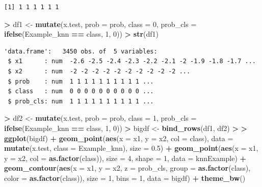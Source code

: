 \documentclass[]{krantz}
\makeatletter
\newenvironment{Shaded}{\begin{snugshade}}{\end{snugshade}}
\newcommand{\KeywordTok}[1]{\textcolor[rgb]{0.27,0.27,0.27}{\textbf{#1}}}
\newcommand{\DataTypeTok}[1]{\textcolor[rgb]{0.27,0.27,0.27}{#1}}
\newcommand{\DecValTok}[1]{\textcolor[rgb]{0.06,0.06,0.06}{#1}}
\newcommand{\FloatTok}[1]{\textcolor[rgb]{0.06,0.06,0.06}{#1}}
\newcommand{\StringTok}[1]{\textcolor[rgb]{0.5,0.5,0.5}{#1}}
\newcommand{\OperatorTok}[1]{\textcolor[rgb]{0.43,0.43,0.43}{\textbf{#1}}}
\newcommand{\ErrorTok}[1]{\textcolor[rgb]{0.14,0.14,0.14}{\textbf{#1}}}
\newcommand{\NormalTok}[1]{#1}
\newenvironment{kframe}{%
\medskip{}
\setlength{\fboxsep}{.8em}
 \def\at@end@of@kframe{}%
 \ifinner\ifhmode%
  \def\at@end@of@kframe{\end{minipage}}%
  \begin{minipage}{\columnwidth}%
 \fi\fi%
 \def\FrameCommand##1{\hskip\@totalleftmargin \hskip-\fboxsep
 \colorbox{shadecolor}{##1}\hskip-\fboxsep
     \hskip-\linewidth \hskip-\@totalleftmargin \hskip\columnwidth}%
 \MakeFramed {\advance\hsize-\width
   \@totalleftmargin\z@ \linewidth\hsize
   \@setminipage}}%
 {\par\unskip\endMakeFramed%
 \at@end@of@kframe}
\renewenvironment{Shaded}{\begin{kframe}}{\end{kframe}}
\makeatother
\begin{document}
\begin{verbatim}
[1] 1 1 1 1 1 1
\end{verbatim}

\begin{Shaded}
\begin{Highlighting}[]
\OperatorTok{>}\StringTok{ }\NormalTok{df1 <-}\StringTok{ }\KeywordTok{mutate}\NormalTok{(x.test, }\DataTypeTok{prob =}\NormalTok{ prob, }\DataTypeTok{class =} \DecValTok{0}\NormalTok{,  }\DataTypeTok{prob_cls =} \KeywordTok{ifelse}\NormalTok{(Example_knn }\OperatorTok{==}\StringTok{ }\NormalTok{class, }\DecValTok{1}\NormalTok{, }\DecValTok{0}\NormalTok{))}
\OperatorTok{>}\StringTok{ }\KeywordTok{str}\NormalTok{(df1)}
\end{Highlighting}
\end{Shaded}

\begin{verbatim}
'data.frame':   3450 obs. of  5 variables:
 $ x1      : num  -2.6 -2.5 -2.4 -2.3 -2.2 -2.1 -2 -1.9 -1.8 -1.7 ...
 $ x2      : num  -2 -2 -2 -2 -2 -2 -2 -2 -2 -2 ...
 $ prob    : num  1 1 1 1 1 1 1 1 1 1 ...
 $ class   : num  0 0 0 0 0 0 0 0 0 0 ...
 $ prob_cls: num  1 1 1 1 1 1 1 1 1 1 ...
\end{verbatim}

\begin{Shaded}
\begin{Highlighting}[]
\OperatorTok{>}\StringTok{ }\NormalTok{df2 <-}\StringTok{ }\KeywordTok{mutate}\NormalTok{(x.test, }\DataTypeTok{prob =}\NormalTok{ prob, }\DataTypeTok{class =} \DecValTok{1}\NormalTok{,  }\DataTypeTok{prob_cls =} \KeywordTok{ifelse}\NormalTok{(Example_knn }\OperatorTok{==}\StringTok{ }\NormalTok{class, }\DecValTok{1}\NormalTok{, }\DecValTok{0}\NormalTok{))}
\OperatorTok{>}\StringTok{ }\NormalTok{bigdf <-}\StringTok{ }\KeywordTok{bind_rows}\NormalTok{(df1, df2)}
\OperatorTok{>}\StringTok{ }
\ErrorTok{>}\StringTok{ }\KeywordTok{ggplot}\NormalTok{(bigdf) }\OperatorTok{+}\StringTok{ }\KeywordTok{geom_point}\NormalTok{(}\KeywordTok{aes}\NormalTok{(}\DataTypeTok{x =}\NormalTok{ x1, }\DataTypeTok{y =}\NormalTok{ x2, }\DataTypeTok{col =}\NormalTok{ class), }\DataTypeTok{data =} \KeywordTok{mutate}\NormalTok{(x.test, }\DataTypeTok{class =}\NormalTok{ Example_knn), }\DataTypeTok{size =} \FloatTok{0.5}\NormalTok{) }\OperatorTok{+}\StringTok{ }\KeywordTok{geom_point}\NormalTok{(}\KeywordTok{aes}\NormalTok{(}\DataTypeTok{x =}\NormalTok{ x1, }\DataTypeTok{y =}\NormalTok{ x2, }\DataTypeTok{col =} \KeywordTok{as.factor}\NormalTok{(class)), }\DataTypeTok{size =} \DecValTok{4}\NormalTok{, }\DataTypeTok{shape =} \DecValTok{1}\NormalTok{, }\DataTypeTok{data =}\NormalTok{ knnExample) }\OperatorTok{+}\StringTok{ }\KeywordTok{geom_contour}\NormalTok{(}\KeywordTok{aes}\NormalTok{(}\DataTypeTok{x =}\NormalTok{ x1, }\DataTypeTok{y =}\NormalTok{ x2, }\DataTypeTok{z =}\NormalTok{ prob_cls, }\DataTypeTok{group =} \KeywordTok{as.factor}\NormalTok{(class), }\DataTypeTok{color =} \KeywordTok{as.factor}\NormalTok{(class)), }\DataTypeTok{size =} \DecValTok{1}\NormalTok{, }\DataTypeTok{bins =} \DecValTok{1}\NormalTok{, }\DataTypeTok{data =}\NormalTok{ bigdf) }\OperatorTok{+}\StringTok{ }\KeywordTok{theme_bw}\NormalTok{()}
\end{Highlighting}
\end{Shaded}
\end{document}

